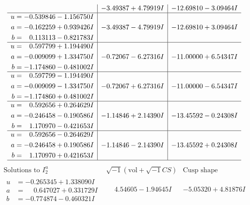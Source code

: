 \documentclass[1p]{elsarticle_modified}
\theoremstyle{definition}
\newcommand{\I}{\sqrt{-1}}
\begin{document}
$$\begin{array}{c|c|c}
 & -3.49387 + 4.79919 I & -12.69810 - 3.09464 I \\ \hline\begin{aligned}
u &= -0.539846 - 1.156750 I \\
a &= -0.162259 + 0.939426 I \\
b &= \phantom{-}0.113113 - 0.821783 I\end{aligned}
 & -3.49387 - 4.79919 I & -12.69810 + 3.09464 I \\ \hline\begin{aligned}
u &= \phantom{-}0.597799 + 1.194490 I \\
a &= -0.009099 + 1.334750 I \\
b &= -1.174860 - 0.481002 I\end{aligned}
 & -0.72067 - 6.27316 I & -11.00000 + 6.54347 I \\ \hline\begin{aligned}
u &= \phantom{-}0.597799 - 1.194490 I \\
a &= -0.009099 - 1.334750 I \\
b &= -1.174860 + 0.481002 I\end{aligned}
 & -0.72067 + 6.27316 I & -11.00000 - 6.54347 I \\ \hline\begin{aligned}
u &= \phantom{-}0.592656 + 0.264629 I \\
a &= -0.246458 - 0.190586 I \\
b &= \phantom{-}1.170970 - 0.421653 I\end{aligned}
 & -1.14846 + 2.14390 I & -13.45592 - 0.24308 I \\ \hline\begin{aligned}
u &= \phantom{-}0.592656 - 0.264629 I \\
a &= -0.246458 + 0.190586 I \\
b &= \phantom{-}1.170970 + 0.421653 I\end{aligned}
 & -1.14846 - 2.14390 I & -13.45592 + 0.24308 I\\
 \hline 
 \end{array}$$\newpage$$\begin{array}{c|c|c}  
\text{Solutions to }I^u_{2}& \I (\text{vol} + \sqrt{-1}CS) & \text{Cusp shape}\\
 \hline 
\begin{aligned}
u &= -0.265345 + 1.338090 I \\
a &= \phantom{-}0.647027 + 0.331729 I \\
b &= -0.774874 - 0.460321 I\end{aligned}
 & \phantom{-}4.54605 - 1.94645 I & -5.05320 + 4.81876 I \\ \hline\begin{aligned}

\end{aligned}
\end{array}$$
\end{document}
